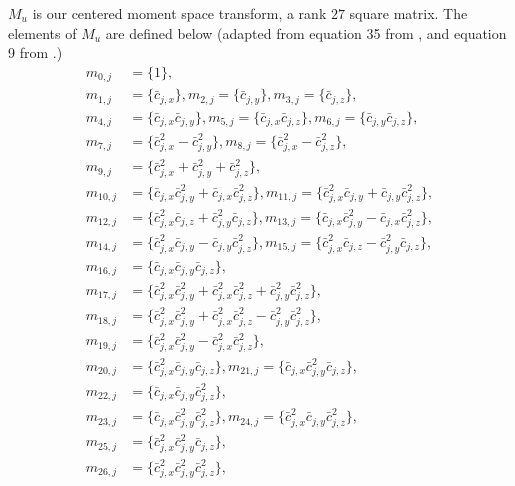 $M_u$ is our centered moment space transform, 
a rank $27$ square matrix.
The elements of $M_u$ are defined below 
(adapted from equation 35 from \cite{Li2020Supplement}, 
and equation 9 from \cite{De2017}.)
\begin{align*}
m_{0,j} &= \{  1 \},\\
m_{1,j} &= \{  \bar{c}_{j,x} \},
m_{2,j} = \{  \bar{c}_{j,y} \},
m_{3,j} = \{  \bar{c}_{j,z} \},\\
m_{4,j} &= \{  \bar{c}_{j,x} \bar{c}_{j,y} \},
m_{5,j} = \{  \bar{c}_{j,x} \bar{c}_{j,z} \},
m_{6,j} = \{  \bar{c}_{j,y} \bar{c}_{j,z} \},\\
m_{7,j} &= \{  \bar{c}_{j,x}^2 - \bar{c}_{j,y}^2 \},
m_{8,j} = \{  \bar{c}_{j,x}^2 - \bar{c}_{j,z}^2 \}, \\
m_{9,j} &= \{  \bar{c}_{j,x}^2 + \bar{c}_{j,y}^2 + \bar{c}_{j,z}^2 \},\\
m_{10,j} &= \{ \bar{c}_{j,x} \bar{c}_{j,y}^2 + \bar{c}_{j,x} \bar{c}_{j,z}^2 \},
m_{11,j} = \{ \bar{c}_{j,x}^2 \bar{c}_{j,y} + \bar{c}_{j,y} \bar{c}_{j,z}^2 \},\\
m_{12,j} &= \{ \bar{c}_{j,x}^2 \bar{c}_{j,z} + \bar{c}_{j,y}^2 \bar{c}_{j,z} \},
m_{13,j} = \{ \bar{c}_{j,x} \bar{c}_{j,y}^2 - \bar{c}_{j,x} \bar{c}_{j,z}^2 \},\\
m_{14,j} &= \{ \bar{c}_{j,x}^2 \bar{c}_{j,y} - \bar{c}_{j,y} \bar{c}_{j,z}^2 \},
m_{15,j} = \{ \bar{c}_{j,x}^2 \bar{c}_{j,z} - \bar{c}_{j,y}^2 \bar{c}_{j,z} \},\\
m_{16,j} &= \{ \bar{c}_{j,x} \bar{c}_{j,y} \bar{c}_{j,z} \},\\
m_{17,j} &= \{ \bar{c}_{j,x}^2 \bar{c}_{j,y}^2 + \bar{c}_{j,x}^2 \bar{c}_{j,z}^2 + \bar{c}_{j,y}^2 \bar{c}_{j,z}^2 \},\\
m_{18,j} &= \{ \bar{c}_{j,x}^2 \bar{c}_{j,y}^2 + \bar{c}_{j,x}^2 \bar{c}_{j,z}^2 - \bar{c}_{j,y}^2 \bar{c}_{j,z}^2 \}, \\
m_{19,j} &= \{ \bar{c}_{j,x}^2 \bar{c}_{j,y}^2 - \bar{c}_{j,x}^2 \bar{c}_{j,z}^2 \},\\
m_{20,j} &= \{ \bar{c}_{j,x}^2 \bar{c}_{j,y} \bar{c}_{j,z} \},
m_{21,j} = \{ \bar{c}_{j,x} \bar{c}_{j,y}^2 \bar{c}_{j,z} \},\\
m_{22,j} &= \{ \bar{c}_{j,x} \bar{c}_{j,y} \bar{c}_{j,z}^2 \},\\
m_{23,j} &= \{ \bar{c}_{j,x} \bar{c}_{j,y}^2 \bar{c}_{j,z}^2 \},
m_{24,j} = \{ \bar{c}_{j,x}^2 \bar{c}_{j,y} \bar{c}_{j,z}^2 \},\\
m_{25,j} &= \{ \bar{c}_{j,x}^2 \bar{c}_{j,y}^2 \bar{c}_{j,z} \},\\
m_{26,j} &= \{ \bar{c}_{j,x}^2 \bar{c}_{j,y}^2 \bar{c}_{j,z}^2 \},\\
\end{align*}

